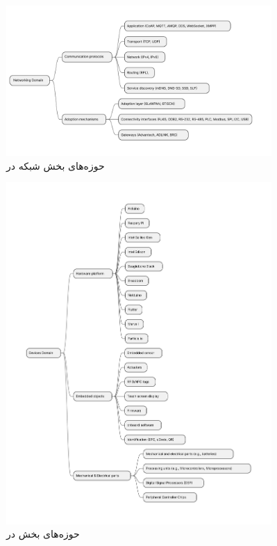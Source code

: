 \begin{figure}[H]
  \centering
  \includegraphics[width=0.9\textwidth]{./figures/IoT_network_domains.pdf}
  \caption{حوزه‌های بخش شبکه در }
  \label{fig:iotNetworkingDomains}
\end{figure}

\begin{figure}[H]
  \centering
  \includegraphics[width=0.9\textwidth]{./figures/IoT_devices_domains.pdf}
  \caption{حوزه‌های بخش  در }
  \label{fig:iotDevicesDomains}
\end{figure}

